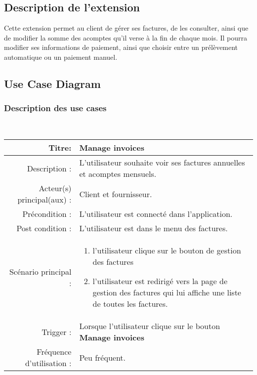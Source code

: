 \documentclass[../rapport.tex]{subfiles}
\begin{document}
\subsection{Description de l'extension}
Cette extension permet au client de gérer ses factures, de les consulter, ainsi que de modifier la somme des acomptes qu'il verse à la fin de chaque mois. Il pourra modifier ses informations de paiement, ainsi que choisir entre un prélèvement automatique ou un paiement manuel. 

\subsection{Use Case Diagram}
\subsubsection{Description des use cases}
\noindent \\
\begin{tabular}{|r|p{9cm}|}
    \hline
    Titre: & Manage invoices \\
    \hline
    Description : & L'utilisateur souhaite voir ses factures annuelles et acomptes mensuels. \\
    \hline
    Acteur(s) principal(aux) : & Client et fournisseur. \\
    \hline
    Précondition : & L'utilisateur est connecté dans l'application. \\
    \hline
    Post condition : & L'utilisateur est dans le menu des factures. \\
    \hline
    Scénario principal : & \begin{enumerate}[left=0pt, topsep=0pt]
        \item l'utilisateur clique sur le bouton de gestion des factures
        \item l'utilisateur est redirigé vers la page de gestion des factures qui lui affiche une liste de toutes les factures. 
    \end{enumerate} \nointerlineskip\\
    \hline
    Trigger : & Lorsque l'utilisateur clique sur le bouton \textbf{Manage invoices} \\ 
    \hline
    Fréquence d'utilisation : & Peu fréquent. \\
    \hline
\end{tabular}
\\ \\ \\
\end{document}
